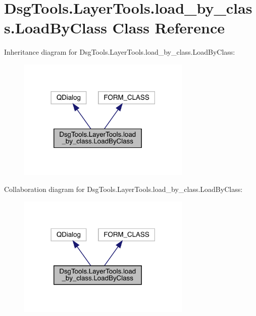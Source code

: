 \hypertarget{class_dsg_tools_1_1_layer_tools_1_1load__by__class_1_1_load_by_class}{}\section{Dsg\+Tools.\+Layer\+Tools.\+load\+\_\+by\+\_\+class.\+Load\+By\+Class Class Reference}
\label{class_dsg_tools_1_1_layer_tools_1_1load__by__class_1_1_load_by_class}


Inheritance diagram for Dsg\+Tools.\+Layer\+Tools.\+load\+\_\+by\+\_\+class.\+Load\+By\+Class\+:
\nopagebreak
\begin{figure}[H]
\begin{center}
\leavevmode
\includegraphics[width=234pt]{class_dsg_tools_1_1_layer_tools_1_1load__by__class_1_1_load_by_class__inherit__graph}
\end{center}
\end{figure}


Collaboration diagram for Dsg\+Tools.\+Layer\+Tools.\+load\+\_\+by\+\_\+class.\+Load\+By\+Class\+:
\nopagebreak
\begin{figure}[H]
\begin{center}
\leavevmode
\includegraphics[width=234pt]{class_dsg_tools_1_1_layer_tools_1_1load__by__class_1_1_load_by_class__coll__graph}
\end{center}
\end{figure}
